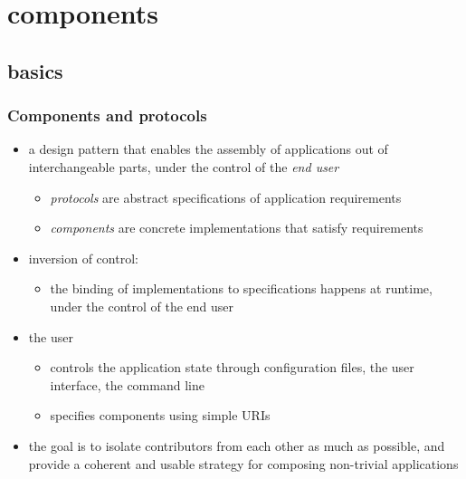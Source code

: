 %



\section{components}
\subsection{basics}

\begin{frame}
%
  \frametitle{Components and protocols}
%
  \begin{itemize}
%
    \item a design pattern that enables the assembly of applications out of interchangeable
      parts, under the control of the {\em end user}
      \begin{itemize}
      \item {\em protocols} are abstract specifications of application requirements
      \item {\em components} are concrete implementations that satisfy requirements
      \end{itemize}
%
    \item inversion of control:
      \begin{itemize}
      \item the binding of implementations to specifications happens at runtime, under the
        control of the end user
      \end{itemize}
%
    \item the user
      \begin{itemize}
      \item controls the application state through configuration files, the user interface, the
        command line
      \item specifies components using simple URIs
      \end{itemize}
%
    \item the goal is to isolate contributors from each other as much as possible, and provide
      a coherent and usable strategy for composing non-trivial applications
%
  \end{itemize}
%
\end{frame}

